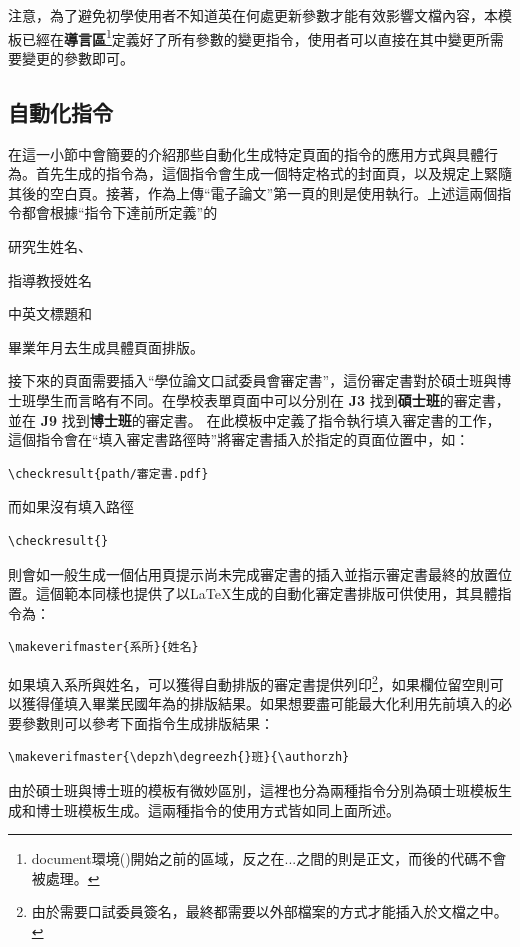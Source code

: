 \documentclass[12pt]{report}
\theoremstyle{plain}
\renewcommand{\authorzh}{佚名}
\renewcommand{\degreezh}{碩士}
\renewcommand{\depzh}{電子工程系}
\begin{document}
注意，為了避免初學使用者不知道英在何處更新參數才能有效影響文檔內容，本模板已經在\textbf{導言區}\footnote{document環境()開始之前的區域，反之在...之間的則是正文，而後的代碼不會被處理。}定義好了所有參數的變更指令，使用者可以直接在其中變更所需要變更的參數即可。

\subsection{自動化指令}

在這一小節中會簡要的介紹那些自動化生成特定頁面的指令的應用方式與具體行為。首先生成的指令為，這個指令會生成一個特定格式的封面頁，以及規定上緊隨其後的空白頁。接著，作為上傳``電子論文''第一頁的則是使用執行。上述這兩個指令都會根據``指令下達前所定義''的
\begin{enumerate*}
    \item 研究生姓名、
    \item 指導教授姓名
    \item 中英文標題和
    \item 畢業年月去生成具體頁面排版。
\end{enumerate*}

接下來的頁面需要插入``學位論文口試委員會審定書''，這份審定書對於碩士班與博士班學生而言略有不同。在學校表單頁面\cite{ntutsheet}中可以分別在 \textbf{J3} 找到\textbf{碩士班}的審定書，並在 \textbf{J9} 找到\textbf{博士班}的審定書。
在此模板中定義了指令執行填入審定書的工作，這個指令會在``填入審定書路徑時''將審定書插入於指定的頁面位置中，如：
\begin{lstlisting}
\checkresult{path/審定書.pdf}
\end{lstlisting}
而如果沒有填入路徑
\begin{lstlisting}
\checkresult{}
\end{lstlisting}
則會如一般生成一個佔用頁提示尚未完成審定書的插入並指示審定書最終的放置位置。這個範本同樣也提供了以\LaTeX 生成的自動化審定書排版可供使用，其具體指令為：
\begin{lstlisting}
\makeverifmaster{系所}{姓名}
\end{lstlisting}
如果填入系所與姓名，可以獲得自動排版的審定書提供列印\footnote{由於需要口試委員簽名，最終都需要以外部檔案的方式才能插入於文檔之中。}，如果欄位留空則可以獲得僅填入畢業民國年為的排版結果。如果想要盡可能最大化利用先前填入的必要參數則可以參考下面指令生成排版結果：
\begin{lstlisting}
\makeverifmaster{\depzh\degreezh{}班}{\authorzh}
\end{lstlisting}
由於碩士班與博士班的模板有微妙區別，這裡也分為兩種指令分別為碩士班模板生成和博士班模板生成。這兩種指令的使用方式皆如同上面所述。
\end{document}

